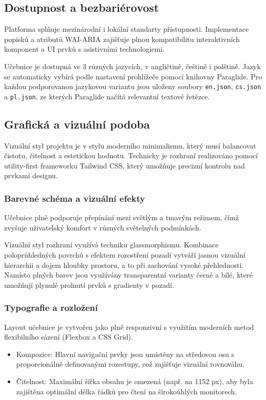 \documentclass[12pt]{article}
\begin{document}
\subsection{Dostupnost a bezbariérovost}
Platforma splňuje mezinárodní i lokální standarty přístupnosti.
Implementace popisků a atributů WAI-ARIA zajišťuje plnou kompatibilitu interaktivních komponent a UI prvků s asistivními technologiemi. 

Učebnice je dostupná ve 3 různých jazycích, v angličtině, češtině i polštině. Jazyk se automaticky vybírá podle nastavení prohlížeče pomocí knihovny Paraglide. Pro každou podporovanou jazykovou variantu jsou uloženy soubory \texttt{en.json}, \texttt{cs.json} a \texttt{pl.json}, ze kterých Paraglide načítá relevantní textové řetězce.

\subsection{Grafická a vizuální podoba}
Vizuální styl projektu je v stylu moderního minimalismu, který musí balancovat čistotu, čitelnost a estetickou hodnotu. Technicky je rozhraní realizováno pomocí utility-first frameworku Tailwind CSS, který umožňuje precizní kontrolu nad prvkami designu.

\subsubsection{Barevné schéma a vizuální efekty}
Učebnice plně podporuje přepínání mezi světlým a tmavým režimem, čímž zvyšuje uživatelský komfort v různých světelných podmínkách.

Vizuální styl rozhraní využívá techniku glassmorphismu. Kombinace poloprůhledných povrchů s efektem rozostření pozadí vytváří jasnou vizuální hierarchii a dojem hloubky prostoru, a to při zachování vysoké přehlednosti. Namísto plných barev jsou využívány transparentní varianty černé a bílé, které umožňují plynulé prolnutí prvků s gradienty v pozadí.

\subsubsection{Typografie a rozložení}
Layout učebnice je vytvořen jako plně responzivní s využitím moderních metod flexibilního sázení (Flexbox a CSS Grid).

\begin{itemize}
	\item{} Kompozice: Hlavní navigační prvky jsou umístěny na středovou osu s proporcionálně definovanými rozestupy, což zajišťuje vizuální rovnováhu.

	\item{} Čitelnost: Maximální šířka obsahu je omezená (např. na 1152 px), aby byla zajištěna optimální délka řádků pro čtení na širokoúhlých monitorech.
\end{itemize}
\end{document}
